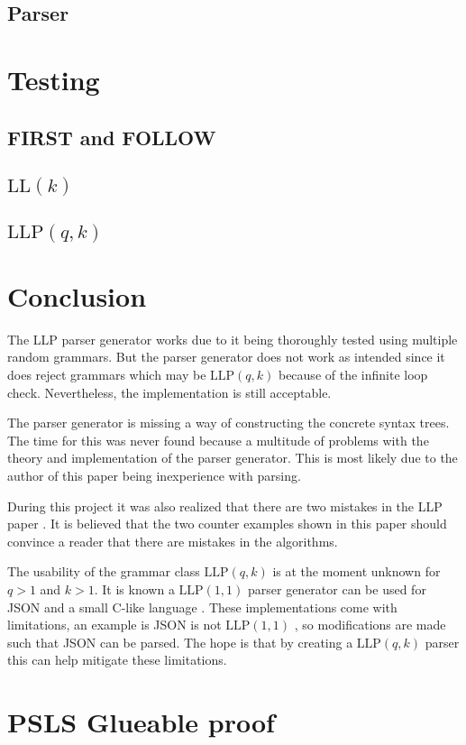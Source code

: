 \documentclass[a4paper,12pt]{article}
\newcommand\LL{\text{LL}}
\newcommand\LLP{\text{LLP}}
\theoremstyle{definition}
\begin{document}
\subsection{Parser}


\section{Testing}
\subsection{FIRST and FOLLOW}


\subsection{\texorpdfstring{$\LL(k)$}{TEXT}}


\subsection{\texorpdfstring{$\LLP(q,k)$}{TEXT}}


\newpage
\section{Conclusion}
The LLP parser generator works due to it being thoroughly tested using multiple random grammars. But the parser generator does not work as intended since it does reject grammars which may be $\LLP(q,k)$ because of the infinite loop check. Nevertheless, the implementation is still acceptable.

The parser generator is missing a way of constructing the concrete syntax trees. The time for this was never found because a multitude of problems with the theory and implementation of the parser generator. This is most likely due to the author of this paper being inexperience with parsing.

During this project it was also realized that there are two mistakes in the LLP paper \cite{Vagner2007}. It is believed that the two counter examples shown in this paper should convince a reader that there are mistakes in the algorithms.

The usability of the grammar class $\LLP(q, k)$ is at the moment unknown for $q > 1$ and $k > 1$. It is known a $\LLP(1, 1)$ parser generator can be used for JSON and a small C-like language \cite{voetter2021}. These implementations come with limitations, an example is JSON is not $\LLP(1, 1)$ \cite[60]{voetter2021}, so modifications are made such that JSON can be parsed. The hope is that by creating a $\LLP(q, k)$ parser this can help mitigate these limitations.

\printbibliography
\appendix
\section{PSLS Glueable proof}

\end{document}
